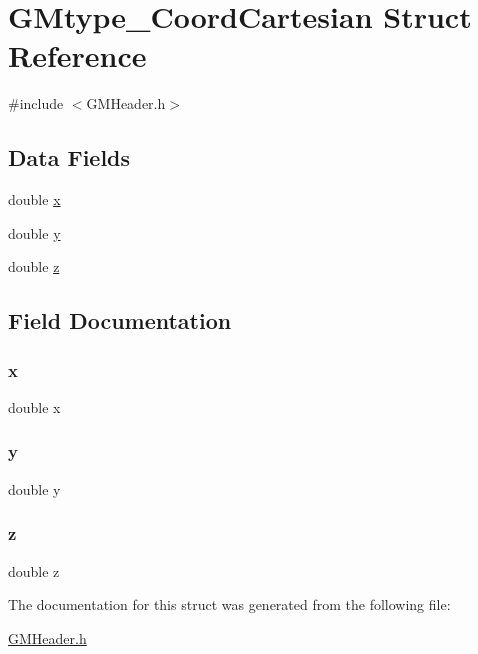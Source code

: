 \hypertarget{struct_g_mtype___coord_cartesian}{}\section{G\+Mtype\+\_\+\+Coord\+Cartesian Struct Reference}
\label{struct_g_mtype___coord_cartesian}


{\ttfamily \#include $<$G\+M\+Header.\+h$>$}

\subsection*{Data Fields}
\begin{DoxyCompactItemize}
\item 
double \mbox{\hyperlink{struct_g_mtype___coord_cartesian_af88b946fb90d5f08b5fb740c70e98c10}{x}}
\item 
double \mbox{\hyperlink{struct_g_mtype___coord_cartesian_ab927965981178aa1fba979a37168db2a}{y}}
\item 
double \mbox{\hyperlink{struct_g_mtype___coord_cartesian_ab3e6ed577a7c669c19de1f9c1b46c872}{z}}
\end{DoxyCompactItemize}


\subsection{Field Documentation}
\mbox{\label{struct_g_mtype___coord_cartesian_af88b946fb90d5f08b5fb740c70e98c10}} 
\subsubsection{\texorpdfstring{x}{x}}
{\footnotesize\ttfamily double x}

\mbox{\label{struct_g_mtype___coord_cartesian_ab927965981178aa1fba979a37168db2a}} 
\subsubsection{\texorpdfstring{y}{y}}
{\footnotesize\ttfamily double y}

\mbox{\label{struct_g_mtype___coord_cartesian_ab3e6ed577a7c669c19de1f9c1b46c872}} 
\subsubsection{\texorpdfstring{z}{z}}
{\footnotesize\ttfamily double z}



The documentation for this struct was generated from the following file\+:\begin{DoxyCompactItemize}
\item 
\mbox{\hyperlink{_g_m_header_8h}{G\+M\+Header.\+h}}\end{DoxyCompactItemize}
